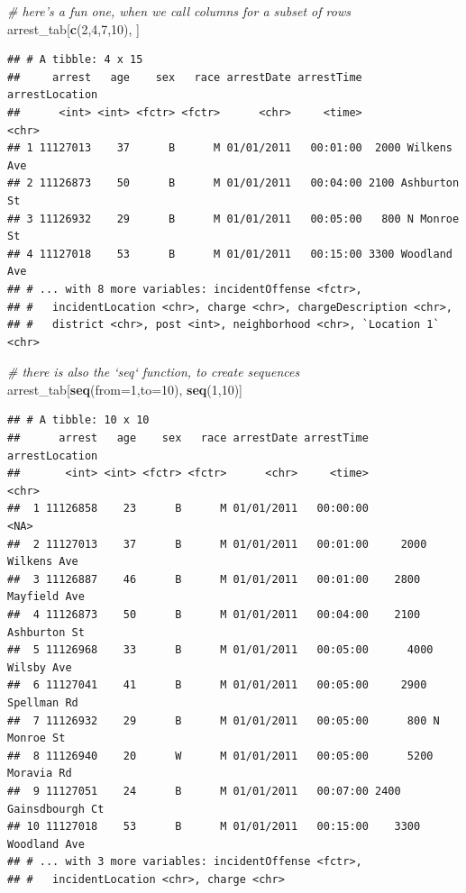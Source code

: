 \documentclass[]{book}
\newenvironment{Shaded}{\begin{snugshade}}{\end{snugshade}}
\newcommand{\KeywordTok}[1]{\textcolor[rgb]{0.13,0.29,0.53}{\textbf{#1}}}
\newcommand{\DataTypeTok}[1]{\textcolor[rgb]{0.13,0.29,0.53}{#1}}
\newcommand{\DecValTok}[1]{\textcolor[rgb]{0.00,0.00,0.81}{#1}}
\newcommand{\CommentTok}[1]{\textcolor[rgb]{0.56,0.35,0.01}{\textit{#1}}}
\newcommand{\NormalTok}[1]{#1}
\theoremstyle{definition}
\theoremstyle{definition}
\theoremstyle{remark}
\begin{document}
\begin{Shaded}
\begin{Highlighting}[]
\CommentTok{# here's a fun one, when we call columns for a subset of rows}
\NormalTok{arrest_tab[}\KeywordTok{c}\NormalTok{(}\DecValTok{2}\NormalTok{,}\DecValTok{4}\NormalTok{,}\DecValTok{7}\NormalTok{,}\DecValTok{10}\NormalTok{), ]}
\end{Highlighting}
\end{Shaded}

\begin{verbatim}
## # A tibble: 4 x 15
##     arrest   age    sex   race arrestDate arrestTime    arrestLocation
##      <int> <int> <fctr> <fctr>      <chr>     <time>             <chr>
## 1 11127013    37      B      M 01/01/2011   00:01:00  2000 Wilkens Ave
## 2 11126873    50      B      M 01/01/2011   00:04:00 2100 Ashburton St
## 3 11126932    29      B      M 01/01/2011   00:05:00   800 N Monroe St
## 4 11127018    53      B      M 01/01/2011   00:15:00 3300 Woodland Ave
## # ... with 8 more variables: incidentOffense <fctr>,
## #   incidentLocation <chr>, charge <chr>, chargeDescription <chr>,
## #   district <chr>, post <int>, neighborhood <chr>, `Location 1` <chr>
\end{verbatim}

\begin{Shaded}
\begin{Highlighting}[]
\CommentTok{# there is also the `seq` function, to create sequences}
\NormalTok{arrest_tab[}\KeywordTok{seq}\NormalTok{(}\DataTypeTok{from=}\DecValTok{1}\NormalTok{,}\DataTypeTok{to=}\DecValTok{10}\NormalTok{), }\KeywordTok{seq}\NormalTok{(}\DecValTok{1}\NormalTok{,}\DecValTok{10}\NormalTok{)]}
\end{Highlighting}
\end{Shaded}

\begin{verbatim}
## # A tibble: 10 x 10
##      arrest   age    sex   race arrestDate arrestTime       arrestLocation
##       <int> <int> <fctr> <fctr>      <chr>     <time>                <chr>
##  1 11126858    23      B      M 01/01/2011   00:00:00                 <NA>
##  2 11127013    37      B      M 01/01/2011   00:01:00     2000 Wilkens Ave
##  3 11126887    46      B      M 01/01/2011   00:01:00    2800 Mayfield Ave
##  4 11126873    50      B      M 01/01/2011   00:04:00    2100 Ashburton St
##  5 11126968    33      B      M 01/01/2011   00:05:00      4000 Wilsby Ave
##  6 11127041    41      B      M 01/01/2011   00:05:00     2900 Spellman Rd
##  7 11126932    29      B      M 01/01/2011   00:05:00      800 N Monroe St
##  8 11126940    20      W      M 01/01/2011   00:05:00      5200 Moravia Rd
##  9 11127051    24      B      M 01/01/2011   00:07:00 2400 Gainsdbourgh Ct
## 10 11127018    53      B      M 01/01/2011   00:15:00    3300 Woodland Ave
## # ... with 3 more variables: incidentOffense <fctr>,
## #   incidentLocation <chr>, charge <chr>
\end{verbatim}
\end{document}
